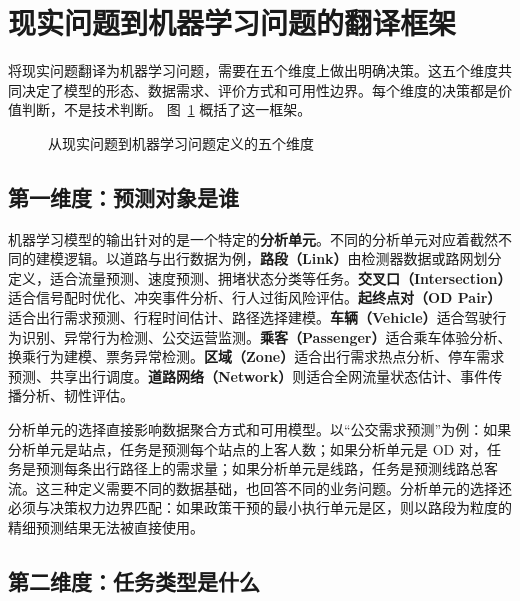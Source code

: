 \section{现实问题到机器学习问题的翻译框架}

将现实问题翻译为机器学习问题，需要在五个维度上做出明确决策。这五个维度共同决定了模型的形态、数据需求、评价方式和可用性边界。每个维度的决策都是价值判断，不是技术判断。
图~\ref{fig:ch03_dims} 概括了这一框架。

\begin{figure}[H]
  \centering
  \caption{从现实问题到机器学习问题定义的五个维度}
  \label{fig:ch03_dims}
\end{figure}

\subsection{第一维度：预测对象是谁}

机器学习模型的输出针对的是一个特定的\textbf{分析单元}。不同的分析单元对应着截然不同的建模逻辑。以道路与出行数据为例，\textbf{路段（Link）}由检测器数据或路网划分定义，适合流量预测、速度预测、拥堵状态分类等任务。\textbf{交叉口（Intersection）}适合信号配时优化、冲突事件分析、行人过街风险评估。\textbf{起终点对（OD Pair）}适合出行需求预测、行程时间估计、路径选择建模。\textbf{车辆（Vehicle）}适合驾驶行为识别、异常行为检测、公交运营监测。\textbf{乘客（Passenger）}适合乘车体验分析、换乘行为建模、票务异常检测。\textbf{区域（Zone）}适合出行需求热点分析、停车需求预测、共享出行调度。\textbf{道路网络（Network）}则适合全网流量状态估计、事件传播分析、韧性评估。

分析单元的选择直接影响数据聚合方式和可用模型。以“公交需求预测”为例：如果分析单元是站点，任务是预测每个站点的上客人数；如果分析单元是 OD 对，任务是预测每条出行路径上的需求量；如果分析单元是线路，任务是预测线路总客流。这三种定义需要不同的数据基础，也回答不同的业务问题。分析单元的选择还必须与决策权力边界匹配：如果政策干预的最小执行单元是区，则以路段为粒度的精细预测结果无法被直接使用。

\subsection{第二维度：任务类型是什么}

